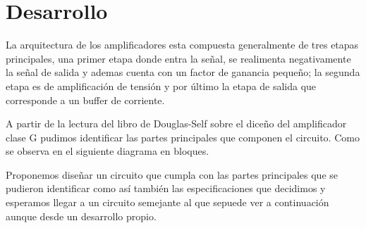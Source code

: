 \documentclass[a4paper,12pt,twoside]{article}
\begin{document}


\newpage
\vfill
\tableofcontents
\vfill

\newpage

\section{Desarrollo}

La arquitectura de los amplificadores esta compuesta generalmente de tres etapas principales, una primer etapa donde entra la señal, se realimenta negativamente la señal de salida y ademas cuenta con un factor de ganancia pequeño; la segunda etapa es de amplificación de tensión y por último la etapa de salida que corresponde a un buffer de corriente.

A partir de la lectura del libro de Douglas-Self sobre el diceño del amplificador clase G pudimos identificar las partes principales que componen el circuito. Como se observa en el siguiente diagrama en bloques.


Proponemos diseñar un circuito que cumpla con las partes principales que se pudieron identificar como así también las especificaciones que decidimos y esperamos llegar a un circuito semejante al que sepuede ver a continuación aunque desde un desarrollo propio.

\end{document}
